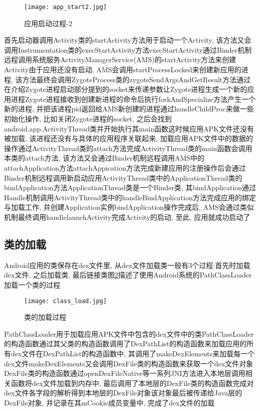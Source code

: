 \begin{figure}[ht]
	\centering
	\texttt{[image: app\_start2.jpg]}
	\caption{应用启动过程-2}
	\label{appStart2}
\end{figure}
首先启动器调用Activity类的startActivity方法用于启动一个Activity, 该方法又会调用Instrumentation类的execStartActivity方法\juhao  execStartActivity通过Binder机制远程调用系统服务ActivityManagerService(AMS)的startActivity方法来创建Activity\juhao 由于应用还没有启动, AMS会调用startProcessLocked来创建新应用的进程, 该方法最终会调用ZygoteProcess类的zygoteSendArgsAndGetResult方法通过在介绍Zygote进程启动部分提到的socket来传递参数让Zygote进程生成一个新的应用进程\juhao Zygote进程接收到创建新进程的命令后执行forkAndSpecialize方法产生一个新的进程, 并把该进程pid返回给AMS\juhao 新创建的进程通过handleChildProc来做一些初始化操作, 比如关闭Zygote进程的socket, 之后会找到android.app.ActivityThread类并开始执行其main函数\juhao 这时候应用APK文件还没有被加载, 该进程还没有与具体的应用程序关联起来, 加载应用APK文件中的数据的操作通过ActivityThread类的attach方法完成\juhao ActivityThread类的main函数会调用本类的attach方法, 该方法又会通过Binder机制远程调用AMS中的attachApplication方法\juhao attachAppication方法完成新建应用的注册操作后会通过Binder机制远程调用新启动应用ActivityThread类中的ApplicationThread类的bindApplication方法\juhao ApplicationThread类是一个Binder类, 其bindApplication通过Handle机制调用ActivityThread类中的handleBindApplication方法完成应用的绑定与加载工作, 并创建Application实例\juhao bindApplication操作完成后, AMS会通过类似机制最终调用handlelaunchActivity完成Activity的启动, 至此, 应用就成功启动了\juhao 

\subsection{类的加载}
\label{clasLoadA}
Android应用的类保存在dex文件里, 从dex文件加载类一般有3个过程:首先时加载dex文件, 之后加载类, 最后链接类\juhao 图\ref{classLoad}描述了使用Android系统的PathClassLoader加载一个类的过程\juhao 
\begin{figure}[ht]
	\centering
	\texttt{[image: class\_load.jpg]}
	\caption{类的加载过程}
	\label{classLoad}
\end{figure}
PathClassLoader用于加载应用APK文件中包含的dex文件中的类\juhao PathClassLoader的构造函数通过其父类的构造函数调用了DexPathList的构造函数来加载应用的所有dex文件\juhao 在DexPathList的构造函数中, 其调用了makeDexElements来加载每一个dex文件\juhao makeDexElements又会调用DexFile类的构造函数来获取一个dex文件对象\juhao DexFile类的构造函数通过openDexFileNative等一系列JNI方法进入本地层调用相关函数将dex文件加载到内存中, 最后调用了本地层的DexFile类的构造函数完成对dex文件各字段的解析得到本地层的DexFile对象\juhao 该对象最后被传递给Java层的DexFile对象, 并记录在其mCookie成员变量中, 完成了dex文件的加载\juhao

